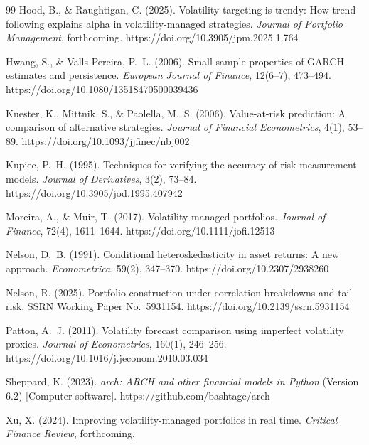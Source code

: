 \documentclass[review,12pt]{elsarticle}
\begin{document}
\begin{thebibliography}{99}
Hood, B., \& Raughtigan, C. (2025). Volatility targeting is trendy: How trend following explains alpha in volatility-managed strategies. \textit{Journal of Portfolio Management}, forthcoming. https://doi.org/10.3905/jpm.2025.1.764

Hwang, S., \& Valls Pereira, P.~L. (2006). Small sample properties of GARCH estimates and persistence. \textit{European Journal of Finance}, 12(6--7), 473--494. https://doi.org/10.1080/13518470500039436

Kuester, K., Mittnik, S., \& Paolella, M.~S. (2006). Value-at-risk prediction: A comparison of alternative strategies. \textit{Journal of Financial Econometrics}, 4(1), 53--89. https://doi.org/10.1093/jjfinec/nbj002

Kupiec, P.~H. (1995). Techniques for verifying the accuracy of risk measurement models. \textit{Journal of Derivatives}, 3(2), 73--84. https://doi.org/10.3905/jod.1995.407942

Moreira, A., \& Muir, T. (2017). Volatility-managed portfolios. \textit{Journal of Finance}, 72(4), 1611--1644. https://doi.org/10.1111/jofi.12513

Nelson, D.~B. (1991). Conditional heteroskedasticity in asset returns: A new approach. \textit{Econometrica}, 59(2), 347--370. https://doi.org/10.2307/2938260

Nelson, R. (2025). Portfolio construction under correlation breakdowns and tail risk. SSRN Working Paper No.~5931154. https://doi.org/10.2139/ssrn.5931154

Patton, A.~J. (2011). Volatility forecast comparison using imperfect volatility proxies. \textit{Journal of Econometrics}, 160(1), 246--256. https://doi.org/10.1016/j.jeconom.2010.03.034

Sheppard, K. (2023). \textit{arch: ARCH and other financial models in Python} (Version 6.2) [Computer software]. https://github.com/bashtage/arch

Xu, X. (2024). Improving volatility-managed portfolios in real time. \textit{Critical Finance Review}, forthcoming.

\end{thebibliography}
\endgroup
\end{document}
